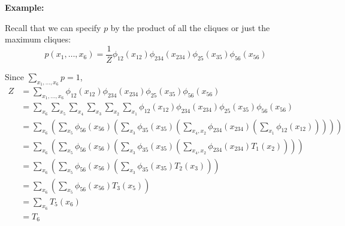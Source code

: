 \documentclass[12pt]{report}
\newcommand*{\tbf}[1]{\ifmmode\mathbf{#1}\else\textbf{#1}\fi}
\begin{document}
\tbf{Example:}

\begin{center}
\end{center}

Recall that we can specify $p$ by the product of all the cliques or just the maximum cliques:
\[p(x_1, \dots, x_6) = \frac{1}{Z} \phi_{12}(x_{12}) \phi_{234}(x_{234}) \phi_{25}(x_{35}) \phi_{56}(x_{56})\]

Since $\sum_{x_1, \dots, x_6} p = 1$,
\begin{align*}
    Z & = \sum_{x_1, \dots, x_6} \phi_{12}(x_{12}) \phi_{234}(x_{234}) \phi_{25}(x_{35}) \phi_{56}(x_{56})                                                                                             \\
      & = \sum_{x_6} \sum_{x_5} \sum_{x_4} \sum_{x_3} \sum_{x_2} \sum_{x_1} \phi_{12}(x_{12}) \phi_{234}(x_{234}) \phi_{25}(x_{35}) \phi_{56}(x_{56})                                                  \\
      & = \sum_{x_6} \left(\sum_{x_5} \phi_{56}(x_{56}) \left(\sum_{x_3} \phi_{35}(x_{35}) \left(\sum_{x_4, x_2} \phi_{234}(x_{234}) \left(\sum_{x_1} \phi_{12}(x_{12})\right) \right) \right) \right) \\
      & = \sum_{x_6} \left(\sum_{x_5} \phi_{56}(x_{56}) \left(\sum_{x_3} \phi_{35}(x_{35}) \left(\sum_{x_4, x_2} \phi_{234}(x_{234}) T_1(x_2)\right) \right) \right)                                   \\
      & = \sum_{x_6} \left(\sum_{x_5} \phi_{56}(x_{56}) \left(\sum_{x_3} \phi_{35}(x_{35}) T_2(x_3) \right)\right)                                                                                     \\
      & = \sum_{x_6} \left(\sum_{x_5} \phi_{56}(x_{56}) T_3(x_5)\right)                                                                                                                                \\
      & = \sum_{x_6} T_5(x_6)                                                                                                                                                                          \\
      & = T_6
\end{align*}
\end{document}
